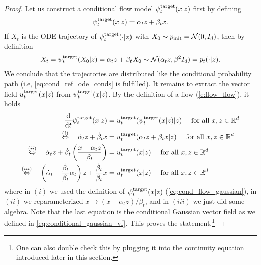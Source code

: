\begin{examplebox}
\begin{proof}
Let us construct a conditional flow model $\psi^{\text{target}}_t(x|z)$ first by defining
\begin{align}
    \label{eq:cond_flow_gaussian}
    \psi^{\text{target}}_t(x|z) = \alpha_t z + \beta_t x.
\end{align}
If $X_t$ is the ODE trajectory of $\psi^{\text{target}}_t(\cdot|z)$ with $X_0\sim p_{\rm{init}} = \mathcal{N}(0,I_d)$, then by definition
\begin{align*}
    X_t = \psi^{\text{target}}_t(X_0|z) = \alpha_t z + \beta_t X_0 \sim \mathcal{N}(\alpha_t z,\beta^2 I_d) = p_t(\cdot|z).
\end{align*}
We conclude that the trajectories are distributed like the conditional probability path (i.e, \cref{eq:cond_ref_ode_conds} is fulfilled). It remains to extract the vector field $u^{\text{target}}_t(x|z)$ from $\psi^{\text{target}}_t(x|z)$. By the definition of a flow (\cref{e:flow_flow}), it holds
\begin{align*}
      \frac{\mathrm{d}}{\mathrm{d} t}\psi^{\text{target}}_{t}(x|z) &= u^{\text{target}}_t(\psi^{\text{target}}_t(x|z)|z)\quad \text{ for all }x,z\in\mathbb{R}^d\\
    \overset{(i)}{\Leftrightarrow} \quad \dot{\alpha}_tz+\dot{\beta}_tx &= u^{\text{target}}_t(\alpha_tz+\beta_t x|z)\quad \text{ for all }x,z\in\mathbb{R}^d\\
    \overset{(ii)}{\Leftrightarrow} \quad \dot{\alpha}_tz+\dot{\beta}_t\left(\frac{x-\alpha_tz}{\beta_t}\right)&= u^{\text{target}}_t(x|z)\quad \text{ for all }x,z\in\mathbb{R}^d\\
    \overset{(iii)}{\Leftrightarrow} \quad\left(\dot{\alpha}_t-\frac{\dot{\beta}_t}{\beta_t}\alpha_t\right)z+\frac{\dot{\beta}_t}{\beta_t}x &= u^{\text{target}}_t(x|z)\quad \text{ for all }x,z\in\mathbb{R}^d
\end{align*}
where in $(i)$ we used the definition of $\psi^{\text{target}}_t(x|z)$ (\cref{eq:cond_flow_gaussian}), in $(ii)$ we reparameterized $x\rightarrow (x-\alpha_t z)/\beta_t$, and in $(iii)$ we just did some algebra. Note that the last equation is the conditional Gaussian vector field as we defined in \cref{eq:conditional_gaussian_vf}. This proves the statement.\footnote{One can also double check this by plugging it into the continuity equation introduced later in this section.}
\end{proof}
\end{examplebox}

